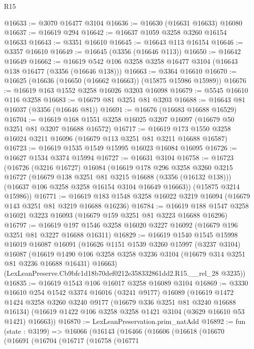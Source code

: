 \begin{lexlean}{R15}
\begin{coremodule}
@16633 := @3070 @16477 @3104
@16636 := @16630 (@16631 @16633) @16080
@16637 := @16619 @294
@16642 := @16637 @1059 @3258 @3260 @16154 @16633
@16643 := @3351 @16610
@16645 := @16643 @113 @16154
@16646 := @3357 @16610
@16649 := @16645 (@3356 (@16646 @113))
@16650 := @16642 @16649
@16662 := @16619 @542 @106 @3258 @3258 @16477 @3104 (@16643 @138 @16477 (@3356 (@16646 @138)))
@16663 := @3364 @16610
@16670 := @16625 (@16636 (@16650 (@16662 @16663)) (@15875 @15986 @15989))
@16676 := @16619 @163 @1552 @3258 @16026 @3203 @16098
@16679 := @5545 @16610 @116 @3258
@16683 := @16679 @81 @3251 @81 @3203
@16688 := @16643 @81 @16037 (@3356 (@16646 @81))
@16691 := @16676 (@16683 @16688 @16529)
@16704 := @16619 @168 @1551 @3258 @16025 @3207 @16097 (@16679 @50 @3251 @81 @3207 @16688 @16572)
@16717 := @16619 @173 @1550 @3258 @16024 @3211 @16096 (@16679 @113 @3251 @81 @3211 @16688 @16587)
@16723 := @16619 @1535 @1549 @15995 @16023 @16084 @16095
@16726 := @16627 @1534 @3374 @15994
@16727 := @16631 @3104
@16758 := @16723
    (@16726
      (@3216 @16727)
      @16084
      (@16619
        @178
        @296
        @3258
        @3260
        @3215
        @16727
        (@16679 @138 @3251 @81 @3215 @16688 (@3356 (@16132 @138)))
        (@16637 @106 @3258 @3258 @16154 @3104 @16649 @16663))
      (@15875 @3214 @15986))
@16771 := @16619 @183 @1548 @3258 @16022 @3219 @16094 (@16679 @143 @3251 @81 @3219 @16688 @16236)
@16784 := @16619 @188 @1547 @3258 @16021 @3223 @16093 (@16679 @159 @3251 @81 @3223 @16688 @16296)
@16797 := @16619 @197 @1546 @3258 @16020 @3227 @16092 (@16679 @196 @3251 @81 @3227 @16688 @16311)
@16829 := @16619
    @1540
    @1545
    @15998
    @16019
    @16087
    @16091
    (@16626
      @1151
      @1539
      @3260
      @15997
      (@3237 @3104)
      @16087
      (@16619 @1490 @106 @3258 @3258 @3236 @3104 (@16679 @314 @3251 @81 @3236 @16688 @16431) @16663)
      (LexLeanPreserve.Cb9bfc1d18b70def0212e358332861dd2.R15.__rel_28 @3235))
@16835 := @16619 @1543 @106 @16017 @3258 @16089 @3104
@16869 := @3330
    @16610
    @254
    @1542
    @3374
    @16016
    (@3241 @9177)
    @16089
    (@16619
      @1472
      @1424
      @3258
      @3260
      @3240
      @9177
      (@16679 @336 @3251 @81 @3240 @16688 @16134)
      (@16619 @1422 @106 @3258 @3258 @1421 @3104 (@3629 @16610 @53 @1421) @16663))
@16870 := LexLeanPreservation.prim_natAdd
@16892 := fun (state : @3199) =>
  @16066
    (@16143
      (@16466
        (@16606
          (@16618
            (@16670
              (@16691
                (@16704
                  (@16717
                    (@16758
                      (@16771

\end{coremodule}
\end{lexlean}

